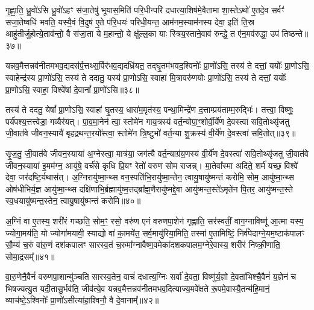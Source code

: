 गृ॒ह्णा॒ति॒ ध्रु॒वो॑\-ऽसि ध्रु॒वो॑\-ऽहꣳ स॑जा॒तेषु॑ भूयास॒मिति॑ परि॒धीन्परि॑ दधात्या॒शिष॑मे॒वैतामा शा॒स्ते\-ऽथो॑ ए॒तदे॒व सर्वꣳ॑ सजा॒तेष्वधि॑ भवति॒ यस्यै॒वं वि॒दुष॑ ए॒ते प॑रि॒धयः॑ परिधी॒यन्त॒ आम॑नम॒स्याम॑नस्य देवा॒ इति॑ ति॒स्र आहु॑तीर्जुहोत्ये॒ताव॑न्तो॒ वै स॑जा॒ता ये म॒हान्तो॒ ये क्षु॑ल्ल॒का याः स्त्रिय॒स्ताने॒वाव॑ रुन्द्धे॒ त ए॑न॒मव॑रुद्धा॒ उप॑ तिष्ठन्ते॥३७॥

{\anuvakamend[{स्वाहाम॑नमसि सजा॒तानाꣳ॑ रुन्द्धे॒ पञ्च॑ च॥९॥}]}

यन्नव॒मैत्तन्नव॑नीतमभव॒द्यदस॑र्प॒त्तथ्स॒र्पिर॑भव॒द्यदध्रि॑यत॒ तद्घृ॒तम॑भवद॒श्विनोः᳚ प्रा॒णो॑\-ऽसि॒ तस्य॑ ते दत्तां॒ ययोः᳚ प्रा॒णो\-ऽसि॒ स्वाहेन्द्र॑स्य प्रा॒णो॑\-ऽसि॒ तस्य॑ ते ददातु॒ यस्य॑ प्रा॒णो\-ऽसि॒ स्वाहा॑ मि॒त्रावरु॑णयोः प्रा॒णो॑\-ऽसि॒ तस्य॑ ते दत्तां॒ ययोः᳚ प्रा॒णो\-ऽसि॒ स्वाहा॒ विश्वे॑षां दे॒वानां᳚ प्रा॒णो॑\-ऽसि॥३८॥

तस्य॑ ते ददतु॒ येषां᳚ प्रा॒णो\-ऽसि॒ स्वाहा॑ घृ॒तस्य॒ धारा॑म॒मृत॑स्य॒ पन्था॒मिन्द्रे॑ण द॒त्ताम्प्रय॑ताम्म॒रुद्भिः॑। तत्त्वा॒ विष्णुः॒ पर्य॑पश्य॒त्तत्त्वेडा॒ गव्यैर॑यत्। पा॒व॒मा॒नेन॑ त्वा॒ स्तोमे॑न गाय॒त्रस्य॑ वर्त॒न्योपा॒ꣳ॒शोर्वी॒र्ये॑ण दे॒वस्त्वा॑ सवि॒तोथ्सृ॑जतु जी॒वात॑वे जीवन॒स्यायै॑ बृहद्रथन्त॒रयो᳚स्त्वा॒ स्तोमे॑न त्रि॒ष्टुभो॑ वर्त॒न्या शु॒क्रस्य॑ वी॒र्ये॑ण दे॒वस्त्वा॑ सवि॒तोत्॥३९॥

सृ॒ज॒तु॒ जी॒वात॑वे जीवन॒स्याया॑ अ॒ग्नेस्त्वा॒ मात्र॑या॒ जग॑त्यै वर्त॒न्याग्र॑य॒णस्य॑ वी॒र्ये॑ण दे॒वस्त्वा॑ सवि॒तोथ्सृ॑जतु जी॒वात॑वे जीवन॒स्याया॑ इ॒मम॑ग्न॒ आयु॑षे॒ वर्च॑से कृधि प्रि॒यꣳ रेतो॑ वरुण सोम राजन्न्। मा॒तेवा᳚स्मा अदिते॒ शर्म॑ यच्छ॒ विश्वे॑ देवा॒ जर॑दष्टि॒र्यथास॑त्। अ॒ग्निरायु॑ष्मा॒न्थ्स वन॒स्पति॑भि॒रायु॑ष्मा॒न्तेन॒ त्वायु॒षायु॑ष्मन्तं करोमि॒ सोम॒ आयु॑ष्मा॒न्थ्स ओष॑धीभिर्य॒ज्ञ आयु॑ष्मा॒न्थ्स दक्षि॑णाभि॒र्ब्रह्मायु॑ष्म॒त्तद्ब्रा᳚ह्म॒णैरायु॑ष्मद्दे॒वा आयु॑ष्मन्त॒स्ते॑\-ऽमृते॑न पि॒तर॒ आयु॑ष्मन्त॒स्ते स्व॒धयायु॑ष्मन्त॒स्तेन॒ त्वायु॒षायु॑ष्मन्तं करोमि॥४०॥

{\anuvakamend[{विश्वे॑षां दे॒वानां᳚ प्रा॒णो॑\-ऽसि त्रि॒ष्टुभो॑ वर्त॒न्या शु॒क्रस्य॑ वी॒र्ये॑ण दे॒वस्त्वा॑ सवि॒तोत्सोम॒ आयु॑ष्मा॒न्पञ्च॑विꣳशतिश्च॥10॥}]}

अ॒ग्निं वा ए॒तस्य॒ शरी॑रं गच्छति॒ सोम॒ꣳ॒ रसो॒ वरु॑ण एनं वरुणपा॒शेन॑ गृह्णाति॒ सर॑स्वतीं॒ वाग॒ग्नाविष्णू॑ आ॒त्मा यस्य॒ ज्योगा॒मय॑ति॒ यो ज्योगा॑मयावी॒ स्याद्यो वा॑ का॒मये॑त॒ सर्व॒मायु॑रिया॒मिति॒ तस्मा॑ ए॒तामिष्टिं॒ निर्व॑पेदाग्ने॒यम॒ष्टाक॑पालꣳ सौ॒म्यं च॒रुं वा॑रु॒णं दश॑कपालꣳ सारस्व॒तं च॒रुमा᳚ग्नावैष्ण॒वमेका॑दशकपालम॒ग्नेरे॒वास्य॒ शरी॑रं निष्क्री॒णाति॒ सोमा॒द्रसम्᳚॥४१॥

वा॒रु॒णेनै॒वैनं॑ वरुणपा॒शान्मु॑ञ्चति सारस्व॒तेन॒ वाचं॑ दधात्य॒ग्निः सर्वा॑ दे॒वता॒ विष्णु॑र्य॒ज्ञो दे॒वता॑भिश्चै॒वैनं॑ य॒ज्ञेन॑ च भिषज्यत्यु॒त यदी॒तासु॒र्भव॑ति॒ जीव॑त्ये॒व यन्नव॒मैत्तन्नव॑नीतमभव॒दित्याज्य॒मवे᳚क्षते रू॒पमे॒वास्यै॒तन्म॑हि॒मानं॒ व्याच॑ष्टे॒\-ऽश्विनोः᳚ प्रा॒णो॑\-ऽसीत्या॑हा॒श्विनौ॒ वै दे॒वानाम्᳚॥४२॥

